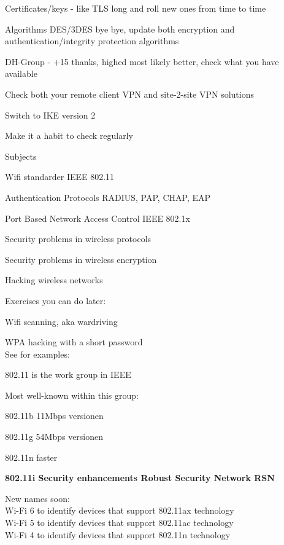\documentclass[Screen16to9,17pt]{foils}
\begin{document}
\begin{list2}
\item Certificates/keys - like TLS long and roll new ones from time to time
\item Algorithms DES/3DES bye bye, update both encryption and authentication/integrity protection algorithms
\item DH-Group - +15 thanks, highed most likely better, check what you have available
\item Check both your remote client VPN and site-2-site VPN solutions
\item Switch to IKE version 2
\item Make it a habit to check regularly
\end{list2}


\begin{list1}
\item Subjects
\begin{list2}

\item Wifi standarder IEEE 802.11
\item Authentication Protocols RADIUS, PAP, CHAP, EAP
\item Port Based Network Access Control IEEE 802.1x
\item Security problems in wireless protocols
\item Security problems in wireless encryption
\item Hacking wireless networks
\end{list2}
\item Exercises you can do later:
\begin{list2}
\item Wifi scanning, aka wardriving
\item WPA hacking with a short password\\
See for examples: 
\end{list2}
\end{list1}




\begin{list1}
\item 802.11 is the work group in IEEE
\item Most well-known within this group:
\begin{list2}
\item 802.11b 11Mbps versionen
\item 802.11g 54Mbps versionen
\item 802.11n faster
\item {\bf 802.11i Security enhancements Robust Security Network RSN}
\end{list2}
\item New names soon:\\
Wi-Fi 6 to identify devices that support 802.11ax technology\\
Wi-Fi 5 to identify devices that support 802.11ac technology\\
Wi-Fi 4 to identify devices that support 802.11n technology
\end{list1}
\end{document}
